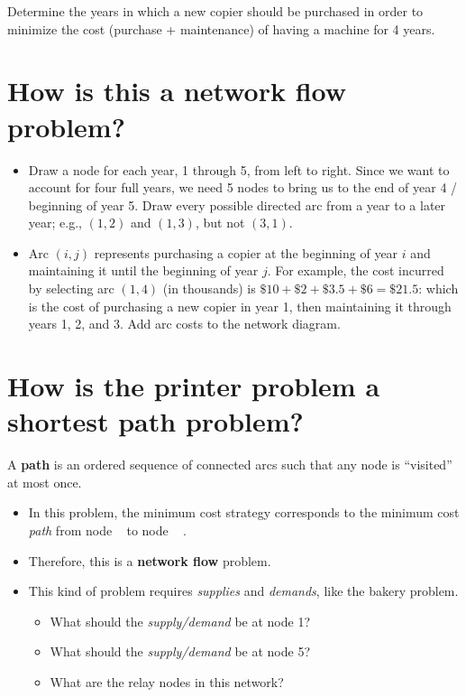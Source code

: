 \documentclass[11pt]{article}
\theoremstyle{definition}
\newcommand{\answerbox}[3]{%
  \fbox{%
    \begin{minipage}[#1]{#2}
      \hfill\vspace{#3}
    \end{minipage}
  }
}
\newcommand{\answerboxone}[2]{%
  \answerbox{#1}{6.0in}{#2} 
}
\newcommand{\wordbox}{\answerbox{c}{1.2in}{.7cm}}
\newcommand{\catbox}{\answerbox{c}{.5in}{.7cm}}
\newcommand{\letterbox}{\answerbox{c}{.7cm}{.7cm}}
\begin{document}
Determine the years in which a new copier should be purchased in order to minimize the cost (purchase + maintenance) of having a machine for 4 years.

\medskip
\section{How is this a network flow problem?}

\begin{itemize}
\item Draw a node for each year, 1 through 5, from left to right.  Since we want to account for four full years, we need 5 nodes to bring us to the end of year 4 / beginning of year 5.  Draw every possible directed arc from a year to a later year; e.g., $(1,2)$ and $(1,3)$, but not $(3,1)$.  

\answerboxone{c}{2in}


\item Arc $(i,j)$ represents  purchasing a copier at the beginning of year $i$ and maintaining it until the beginning of year $j$.  For example, the cost incurred by selecting arc $(1,4)$ (in thousands) is $\$10 + \$2 + \$3.5 + \$6 = \$21.5$: which is the cost of purchasing a new copier in year 1, then maintaining it through years 1, 2, and 3. Add arc costs to the network diagram.

\end{itemize}

\section{How is the printer problem a \textbf{shortest path} problem?}

\begin{tcolorbox}
A \textbf{path} is an ordered sequence of connected arcs such that any node is ``visited'' at most once.
\end{tcolorbox}

\begin{itemize}
\item In this problem, the minimum cost strategy corresponds to the minimum cost \emph{path} from node \letterbox~ to node ~\letterbox.  

\item Therefore, this is a \wordbox \catbox \textbf{network flow} problem.  

\item This kind of problem requires \emph{supplies} and \emph{demands}, like the bakery problem. 
\begin{itemize}
\item What should the \emph{supply/demand} be at node 1?  \catbox
\item What should the \emph{supply/demand} be at node 5?  \catbox
\item  What are the relay nodes in this network?  \wordbox
\end{itemize}
\end{itemize}
\end{document}
